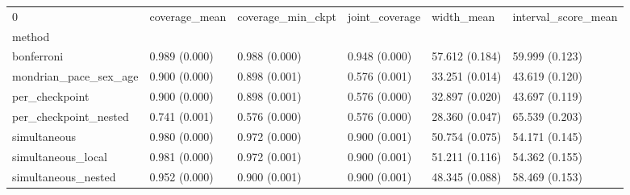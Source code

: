 \begin{tabular}{llllll}
\toprule
0 & coverage\_mean & coverage\_min\_ckpt & joint\_coverage & width\_mean & interval\_score\_mean \\
method &  &  &  &  &  \\
\midrule
bonferroni & 0.989 (0.000) & 0.988 (0.000) & 0.948 (0.000) & 57.612 (0.184) & 59.999 (0.123) \\
mondrian\_pace\_sex\_age & 0.900 (0.000) & 0.898 (0.001) & 0.576 (0.001) & 33.251 (0.014) & 43.619 (0.120) \\
per\_checkpoint & 0.900 (0.000) & 0.898 (0.001) & 0.576 (0.000) & 32.897 (0.020) & 43.697 (0.119) \\
per\_checkpoint\_nested & 0.741 (0.001) & 0.576 (0.000) & 0.576 (0.000) & 28.360 (0.047) & 65.539 (0.203) \\
simultaneous & 0.980 (0.000) & 0.972 (0.000) & 0.900 (0.001) & 50.754 (0.075) & 54.171 (0.145) \\
simultaneous\_local & 0.981 (0.000) & 0.972 (0.001) & 0.900 (0.001) & 51.211 (0.116) & 54.362 (0.155) \\
simultaneous\_nested & 0.952 (0.000) & 0.900 (0.001) & 0.900 (0.001) & 48.345 (0.088) & 58.469 (0.153) \\
\bottomrule
\end{tabular}
